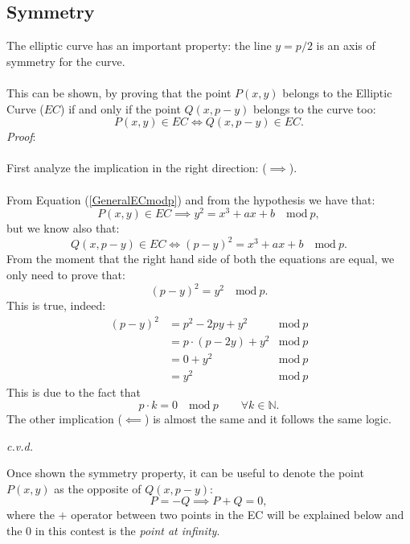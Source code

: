 \subsection{Symmetry}
The elliptic curve has an important property: the line $y=p/2$ is an axis of symmetry for the curve.
\\ \\
This can be shown, by proving that the point $P(x,y)$ belongs to the Elliptic Curve ($EC$) if and only if the point $Q(x,p-y)$ belongs to the curve too:
\begin{equation*}
P(x,y) \in EC \iff Q(x,p-y) \in EC.
\end{equation*}
\textit{Proof}:
\\ \\
First analyze the implication in the right direction: ($\implies $).
\\ \\
From Equation (\ref{GeneralECmodp}) and from the hypothesis we have that:
\begin{equation*}
P(x,y) \in EC \implies y^2=x^3+ax+b \quad \textrm{mod} \ p,
\end{equation*}
but we know also that: 
\begin{equation*}
Q(x,p-y) \in EC \iff (p-y)^2=x^3+ax+b \quad \textrm{mod} \ p.
\end{equation*}
From the moment that the right hand side of both the equations are equal, we only need to prove that:
\begin{equation*}
(p-y)^2=y^2 \quad \textrm{mod} \ p.
\end{equation*}
This is true, indeed:
\begin{align*}
(p-y)^2 & = p^2 -2py + y^2 &  \textrm{mod} \ p \\
& = p\cdot(p -2y) + y^2 &  \textrm{mod} \ p \\
& = 0+y^2 &  \textrm{mod} \ p \\
& = y^2 &  \textrm{mod} \ p
\end{align*}
This is due to the fact that 
\begin{equation*}
p\cdot k =0 \quad \textrm{mod} \ p \qquad \forall k\in \mathbb{N}.
\end{equation*}
The other implication ($\impliedby$) is almost the same and it follows the same logic.
\begin{flushright}
	\textit{c.v.d.}
\end{flushright}
Once shown the symmetry property, it can be useful to denote the point $P(x,y)$ as the opposite of $Q(x,p-y)$:
\begin{equation*}
P=-Q \implies P+Q=0,
\end{equation*}
where the $+$ operator between two points in the EC will be explained below and the $0$ in this contest is the \textit{point at infinity}.

